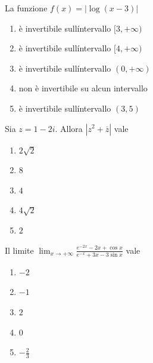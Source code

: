 \begin{quiz}
La funzione $f(x)=|\log(x-3)|$
\begin{enumerate}
\item \`e invertibile sull\'intervallo $[3,+\infty)$
\item \`e invertibile sull\'intervallo $[4,+\infty)$
\item \`e invertibile sull\'intervallo $(0,+\infty)$
\item non \`e invertibile su alcun intervallo
\item \`e invertibile sull\'intervallo $(3,5)$
\end{enumerate}
\end{quiz}

\begin{quiz}
Sia $z=1-2i$. Allora $|z^2+\overline z|$ vale
\begin{enumerate}
\item $2\sqrt2$
\item $8$
\item $4$
\item $4\sqrt2$
\item $2$
\end{enumerate}
\end{quiz}

\begin{quiz}
Il limite $\displaystyle\lim_{x\to+\infty}\frac{e^{-2x}-2x+\cos x}{e^{-x}+3x-3\sin x}$ vale
\begin{enumerate}
\item $-2$
\item $-1$
\item $2$
\item $0$
\item $-\frac23$
\end{enumerate}
\end{quiz}

